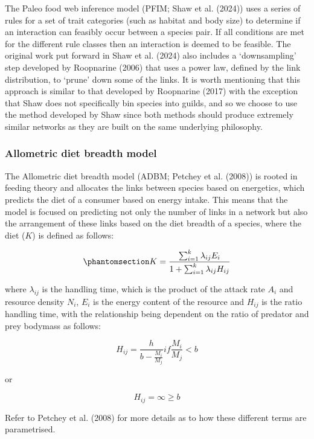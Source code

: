 \documentclass[
]{article}
\begin{document}
The Paleo food web inference model (PFIM; Shaw et al. (2024)) uses a
series of rules for a set of trait categories (such as habitat and body
size) to determine if an interaction can feasibly occur between a
species pair. If all conditions are met for the different rule classes
then an interaction is deemed to be feasible. The original work put
forward in Shaw et al. (2024) also includes a `downsampling' step
developed by Roopnarine (2006) that uses a power law, defined by the
link distribution, to `prune' down some of the links. It is worth
mentioning that this approach is similar to that developed by Roopnarine
(2017) with the exception that Shaw does not specifically bin species
into guilds, and so we choose to use the method developed by Shaw since
both methods should produce extremely similar networks as they are built
on the same underlying philosophy.

\subsubsection{Allometric diet breadth
model}\label{allometric-diet-breadth-model}

The Allometric diet breadth model (ADBM; Petchey et al. (2008)) is
rooted in feeding theory and allocates the links between species based
on energetics, which predicts the diet of a consumer based on energy
intake. This means that the model is focused on predicting not only the
number of links in a network but also the arrangement of these links
based on the diet breadth of a species, where the diet (\(K\)) is
defined as follows:

\begin{equation}\phantomsection\label{eq-adbm}{
K = \frac{\sum_{i=1}^{k}\lambda_{ij}E_{i}}{1+\sum_{i=1}^{k}\lambda_{ij}H_{ij}}
}\end{equation}

where \(\lambda_{ij}\) is the handling time, which is the product of the
attack rate \(A_{i}\) and resource density \(N_{i}\), \(E_{i}\) is the
energy content of the resource and \(H_{ij}\) is the ratio handling
time, with the relationship being dependent on the ratio of predator and
prey bodymass as follows:

\[
H_{ij} = \frac{h}{b - \frac{M_{i}}{M_{j}}} if \frac{M_{i}}{M_{j}} < b
\]

or

\[
H_{ij} = \infty \geq b
\]

Refer to Petchey et al. (2008) for more details as to how these
different terms are parametrised.
\end{document}
